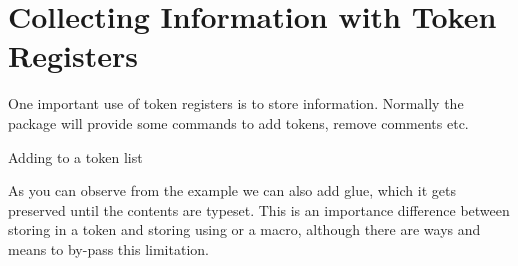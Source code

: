 \section{Collecting Information with Token Registers}

One important use of token registers is to store information. Normally the package will provide some commands to add tokens, remove comments etc.

\begin{teXXX}
\def\addinfo #1{%
    \expandafter\expandafter\expandafter\collecttokens\expandafter{%
          \the\collecttokens #1}
}
\end{teXXX}


\begin{texexample}{Adding to a token list}{}
\bgroup
\makeatletter
\def\addinfo #1{
    \expandafter\expandafter\expandafter\@temptokena\expandafter{%
          \the\@temptokena #1}
}

\addinfo{\hfill}
\addinfo{CHAPTER}
\addinfo{\kern0.5em}
\addinfo{\thechapter}
\the\@temptokena
\makeatother
\egroup
\end{texexample}


As you can observe from the example we can also add glue, which it gets preserved until the contents are typeset. This is an importance difference between storing in a token and storing using \cmd{\edef} or a macro, although there are ways and means to by-pass this limitation.


